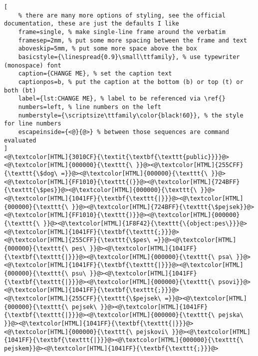 \begin{lstlisting}[
	% there are many more options of styling, see the official documentation, these are just the defaults I like
	frame=single, % make single-line frame around the verbatim
	framesep=2mm, % put some more spacing between the frame and text
	aboveskip=5mm, % put some more space above the box
	basicstyle={\linespread{0.9}\small\ttfamily}, % use typewriter (monospace) font
	caption={CHANGE ME}, % set the caption text
	captionpos=b, % put the caption at the bottom (b) or top (t) or both (bt)
	label={lst:CHANGE ME}, % label to be referenced via \ref{}
	numbers=left, % line numbers on the left
	numberstyle={\scriptsize\ttfamily\color{black!60}}, % the style for line numbers
	escapeinside={<@}{@>} % between those sequences are command evaluated
]
<@\textcolor[HTML]{3010CF}{\textit{\textbf{\texttt{public}}}}@><@\textcolor[HTML]{000000}{\texttt{\ }}@><@\textcolor[HTML]{255CFF}{\texttt{\$dog\ =}}@><@\textcolor[HTML]{000000}{\texttt{\ }}@><@\textcolor[HTML]{FF1010}{\texttt{(}}@><@\textcolor[HTML]{724BFF}{\texttt{\$pes}}@><@\textcolor[HTML]{000000}{\texttt{\ }}@><@\textcolor[HTML]{1041FF}{\textbf{\texttt{|}}}@><@\textcolor[HTML]{000000}{\texttt{\ }}@><@\textcolor[HTML]{724BFF}{\texttt{\$pejsek}}@><@\textcolor[HTML]{FF1010}{\texttt{)}}@><@\textcolor[HTML]{000000}{\texttt{\ }}@><@\textcolor[HTML]{1F8F42}{\texttt{\{object:pes\}}}@><@\textcolor[HTML]{1041FF}{\textbf{\texttt{;}}}@>
<@\textcolor[HTML]{255CFF}{\texttt{\$pes\ =}}@><@\textcolor[HTML]{000000}{\texttt{\ pes\ }}@><@\textcolor[HTML]{1041FF}{\textbf{\texttt{|}}}@><@\textcolor[HTML]{000000}{\texttt{\ psa\ }}@><@\textcolor[HTML]{1041FF}{\textbf{\texttt{|}}}@><@\textcolor[HTML]{000000}{\texttt{\ psu\ }}@><@\textcolor[HTML]{1041FF}{\textbf{\texttt{|}}}@><@\textcolor[HTML]{000000}{\texttt{\ psovi}}@><@\textcolor[HTML]{1041FF}{\textbf{\texttt{;}}}@>
<@\textcolor[HTML]{255CFF}{\texttt{\$pejsek\ =}}@><@\textcolor[HTML]{000000}{\texttt{\ pejsek\ }}@><@\textcolor[HTML]{1041FF}{\textbf{\texttt{|}}}@><@\textcolor[HTML]{000000}{\texttt{\ pejska\ }}@><@\textcolor[HTML]{1041FF}{\textbf{\texttt{|}}}@><@\textcolor[HTML]{000000}{\texttt{\ pejskovi\ }}@><@\textcolor[HTML]{1041FF}{\textbf{\texttt{|}}}@><@\textcolor[HTML]{000000}{\texttt{\ pejskem}}@><@\textcolor[HTML]{1041FF}{\textbf{\texttt{;}}}@>

\end{lstlisting}